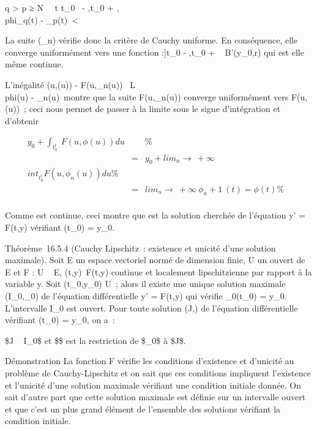 \documentclass[]{article}
\begin{document}
q \textgreater{} p ≥ N \rigtharrow~\forall~t \in{]}t_0~ -
\eta,t_0 + \eta{[}, \\phi_q(t) -
\phi_p(t)\ \textless{} \epsilon

La suite (\phi_n) vérifie donc la critère de Cauchy uniforme. En
conséquence, elle converge uniformément vers une fonction \phi
:{]}t_0 - \eta,t_0 + \eta{[}\rightarrow~ B'(y_0,r) qui est
elle même continue.

L'inégalité \F(u,\phi(u)) -
F(u,\phi_n(u))\ \leq
L\\phi(u) -
\phi_n(u)\, montre que la suite
F(u,\phi_n(u)) converge uniformément vers F(u,\phi(u))~; ceci nous
permet de passer à la limite sous le signe d'intégration et d'obtenir

\begin{align*} y_0
+\int  _t_0^t~F(u,\phi(u))
du&& \%& \\ & =& y_0
+ lim_n\rightarrow~+\infty~~\\int
 _t_0^tF(u,\phi_ n(u)) du\%&
\\ & =&
lim_n\rightarrow~+\infty~\phi_n+1~(t) = \phi(t) \%&
\\ \end{align*}

Comme \phi est continue, ceci montre que \phi est la solution cherchée de
l'équation y' = F(t,y) vérifiant \phi(t_0) = y_0.

Théorème~16.5.4 (Cauchy Lipschitz~: existence et unicité d'une solution
maximale). Soit E un espace vectoriel normé de dimension finie, U un
ouvert de ~ \times E et F : U \rightarrow~ E, (t,y)\mapsto~F(t,y)
continue et localement lipschitzienne par rapport à la variable y. Soit
(t_0,y_0) \in U~; alors il existe une unique solution
maximale (I_0,\phi_0) de l'équation différentielle y' =
F(t,y) qui vérifie \phi_0(t_0) = y_0.
L'intervalle I_0 est ouvert. Pour toute solution (J,\psi) de
l'équation différentielle vérifiant \psi(t_0) = y_0, on
a~:

\text\$J \subset~ I_0\$ et \$\psi\$ est la restriction
de \$\phi_0\$ à \$J\$.

Démonstration La fonction F vérifie les conditions d'existence et
d'unicité au problème de Cauchy-Lipschitz et on sait que ces conditions
impliquent l'existence et l'unicité d'une solution maximale vérifiant
une condition initiale donnée. On sait d'autre part que cette solution
maximale est définie sur un intervalle ouvert et que c'est un plus grand
élément de l'ensemble des solutions vérifiant la condition initiale.
\end{document}
